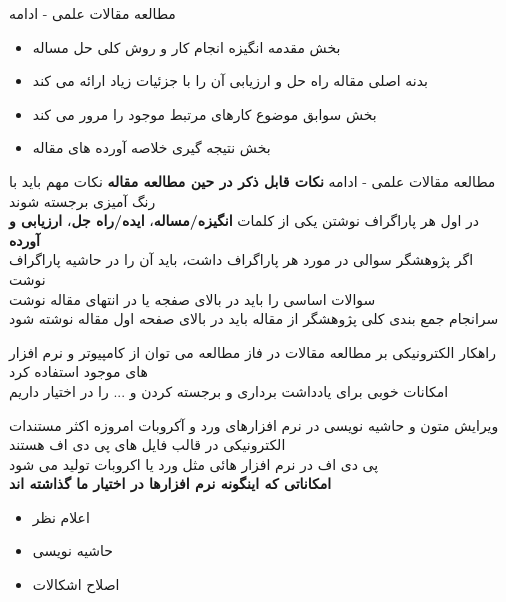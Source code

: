 \documentclass[14pt]{beamer}
\makeatletter
\newcommand{\rtlist}{\raggedleft\rightskip\@totalleftmargin}
\newcommand{\framefontsizelarge}{\fontsize{18pt}{0pt}\selectfont}
\newcommand{\frametitlefontsize}{\fontsize{20pt}{0pt}\selectfont}
\newcommand{\defaultvspace}{\vspace{5mm}}
\makeatother
\begin{document}
\begin{persian}
\begin{frame}{\frametitlefontsize مطالعه مقالات علمی - ادامه}
		\begin{itemize}\rtlist
			\item بخش مقدمه انگیزه انجام کار و روش کلی حل مساله
			\item بدنه اصلی مقاله راه حل و ارزیابی آن را با جزئیات زیاد ارائه می کند
			\item بخش سوابق موضوع کارهای مرتبط موجود را مرور می کند
			\item بخش نتیجه گیری خلاصه آورده های مقاله
		\end{itemize}
	\end{frame}

	\begin{frame}{\frametitlefontsize مطالعه مقالات علمی - ادامه}
		\textbf{\large{نکات قابل ذکر در حین مطالعه مقاله}}\newline\newline
		نکات مهم باید با رنگ آمیزی برجسته شوند\\
		در اول هر پاراگراف نوشتن یکی از کلمات \textbf{انگیزه/مساله}، \textbf{ایده/راه جل}، \textbf{ارزیابی و آورده}\\
		اگر پژوهشگر سوالی در مورد هر پاراگراف داشت، باید آن را در حاشیه پاراگراف نوشت\\
		سوالات اساسی را باید در بالای صفجه یا در انتهای مقاله نوشت\\
		سرانجام جمع بندی کلی پژوهشگر از مقاله باید در بالای صفحه اول مقاله نوشته شود\\
	\end{frame}
	
	\begin{frame}{\frametitlefontsize راهکار الکترونیکی بر مطالعه مقالات}
		\framefontsizelarge
		در فاز مطالعه می توان از کامپیوتر و نرم افزار های موجود استفاده کرد \defaultvspace\\
		امکانات خوبی برای یادداشت برداری و برجسته کردن و ... را در اختیار داریم \\
	\end{frame}

	\begin{frame}{\frametitlefontsize ویرایش متون و حاشیه نویسی در نرم افزارهای ورد و آکروبات}
		\framefontsizelarge
		امروزه اکثر مستندات الکترونیکی در قالب فایل های پی دی اف هستند \defaultvspace\\
		پی دی اف در نرم افزار هائی مثل ورد یا اکروبات تولید می شود \defaultvspace\\
		\textbf{امکاناتی که اینگونه نرم افزارها در اختیار ما گذاشته اند}
		\begin{itemize}\rtlist
			\item اعلام نظر
			\item حاشیه نویسی 
			\item اصلاح اشکالات
		\end{itemize}
	\end{frame}
	

\end{persian}
\end{document}
